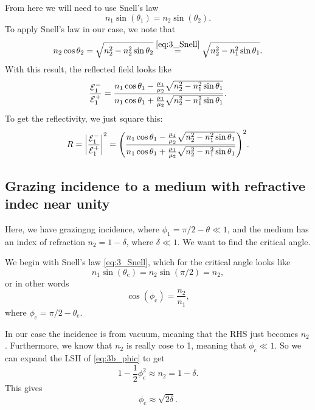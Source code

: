 \documentclass[11pt,letter, swedish, english
]{article}
\begin{document}
From here we will need to use Snell's law
\begin{equation}\label{eq:3_Snell}
n_1\sin(\theta_1) = n_2\sin(\theta_2).
\end{equation}
To apply Snell's law in our case, we note that
\begin{equation}
n_2\cos\theta_2 = \sqrt{n_2^2 - n_2^2\sin\theta_2}
\stackrel{\eqref{eq:3_Snell}}{=} \sqrt{n_2^2 - n_1^2\sin\theta_1}.
\end{equation}
With this result, the reflected field looks like
\begin{equation}
\frac{{\mathcal{E}_1^-}}{{\mathcal{E}_1^+}}=
\frac{n_1\cos\theta_1 - 
\frac{\mu_1}{\mu_2}\sqrt{n_2^2-n_1^2\sin\theta_1}}
{n_1\cos\theta_1 + \frac{\mu_1}{\mu_2}\sqrt{n_2^2-n_1^2\sin\theta_1}}.
\end{equation}
To get the reflectivity, we just square this:
\begin{equation}
R=\abs{\frac{{\mathcal{E}_1^-}}{{\mathcal{E}_1^+}}}^2=
\qty(\frac{n_1\cos\theta_1 - 
\frac{\mu_1}{\mu_2}\sqrt{n_2^2-n_1^2\sin\theta_1}}
{n_1\cos\theta_1 + \frac{\mu_1}{\mu_2}\sqrt{n_2^2-n_1^2\sin\theta_1}}
)^2.
\end{equation}





\subsection{Grazing incidence to a medium with 
refractive indec near unity}
\newcommand{\thetac}{\theta_\text{c}}
\newcommand{\phic}{\phi_\text{c}}

Here, we have grazingng incidence, where 
$\phi_1=\pi/2 - \theta\ll1$, and the medium has an index of refraction
$n_2=1-\delta$, where $\delta\ll1$. We want to find the critical angle. 

We begin with Snell's law \eqref{eq:3_Snell},
which for the critical angle looks like
\begin{equation}
n_1\sin(\thetac) = n_2\sin(\pi/2) = n_2,
\end{equation}
or in other words
\begin{equation}\label{eq:3b_phic}
\cos(\phic) = \frac{n_2}{n_1},
\end{equation}
where $\phic=\pi/2-\theta_\text{c}$.


In our case the incidence is from vacuum, meaning that the RHS just
becomes $n_2$. Furthermore, we know that $n_2$ is really cose to 1,
meaning that $\phic\ll1$. So we can expand the LSH of
\eqref{eq:3b_phic} to get
\begin{equation}
1-\frac{1}{2}\phic^2 \approx n_2 = 1-\delta.
\end{equation}
This gives
\begin{equation}
\phic \approx \sqrt{2\delta}.
\end{equation}
\end{document}
